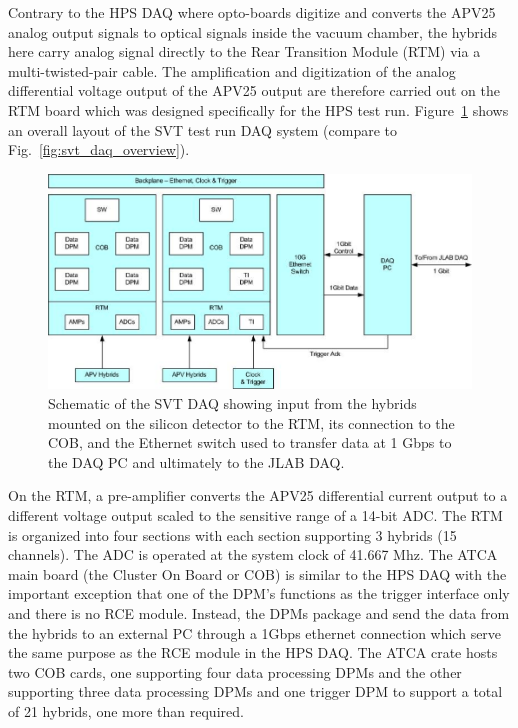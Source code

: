 Contrary to the HPS DAQ where opto-boards digitize and converts the APV25 analog output signals to 
optical signals inside the vacuum chamber, the hybrids here carry analog signal directly to the 
Rear Transition Module (RTM) via a multi-twisted-pair cable. The amplification and digitization of the 
analog differential voltage output of the APV25 output are therefore carried out on the RTM board 
which was designed specifically for the HPS test run. Figure~\ref{fig:svtdaq} shows an overall layout of 
the SVT test run DAQ system (compare to Fig.~\ref{fig:svt_daq_overview}).
 \begin{figure}[t]
\includegraphics[scale=0.9]{test2012/daq/svt_daq_diagram.png}
\caption{\small{Schematic of the SVT DAQ showing input from the hybrids mounted on the silicon detector to the RTM, its connection to the COB, and the Ethernet switch used to transfer data at 1 Gbps to the 
DAQ PC and ultimately to the JLAB DAQ.}}
\label{fig:svtdaq}
\end{figure}
On the RTM, a pre-amplifier converts the APV25 differential current output to a different voltage output 
scaled to the sensitive range of a 14-bit ADC. The RTM is organized into four sections with each section 
supporting 3 hybrids (15 channels). 
The ADC is operated at the system clock of 41.667 Mhz. 
The ATCA main board (the Cluster On Board or COB) is similar to the HPS DAQ with the important exception that one of the DPM's functions as the trigger interface only and there is no RCE module. 
Instead, the DPMs package and send the data from the hybrids to an external PC through a 1Gbps 
ethernet connection which serve the same purpose as the RCE module in the HPS DAQ. 
The ATCA crate hosts two COB cards, one supporting four data processing DPMs and the other supporting three data processing DPMs and one trigger DPM to support a total of 21 hybrids, one more than required. 
